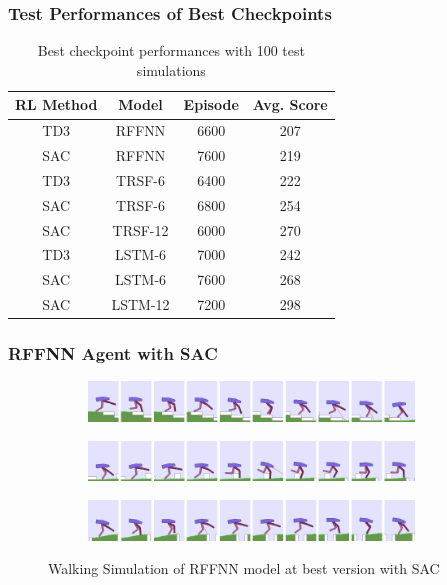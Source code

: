 \documentclass{beamer}
\begin{document}
\begin{frame}
\frametitle{Test Performances of Best Checkpoints}
\begin{table}
	\begin{center}
		\caption{Best checkpoint performances with 100 test simulations}
		\begin{tabular}{||c c c c||} 
			\hline
			RL Method & Model & Episode & Avg. Score \\ [0.5ex] 
			\hline\hline
			TD3 & RFFNN & 6600 & 207 \\ 
			\hline
			SAC & RFFNN & 7600 & 219 \\
			\hline
			TD3 & TRSF-6 & 6400 & 222 \\
			\hline
			SAC & TRSF-6 & 6800 & 254 \\
			\hline
			SAC & TRSF-12 & 6000 & 270 \\
			\hline
			TD3 & LSTM-6 & 7000 & 242 \\
			\hline
			SAC & LSTM-6 & 7600 & 268 \\
			\hline
			SAC & LSTM-12 & 7200 & 298 \\ [1ex] 
			\hline
		\end{tabular}
		\label{table:ckpt_performance}
	\end{center}
\end{table}
\end{frame}

\begin{frame}
\frametitle{RFFNN Agent with SAC}
\begin{figure}[!ht]
	\centering
	\begin{subfigure}{.95\textwidth}
		\centering
		\includegraphics[width=0.95\textwidth]{figures/bipedal/anim/ff-stairs.png}
		\label{fig:anim_rffnn_stairs}
	\end{subfigure}
	\begin{subfigure}{.95\textwidth}
		\centering
		\includegraphics[width=0.95\textwidth]{figures/bipedal/anim/ff-hurdle.png}
		\label{fig:anim_rffnn_hurdle}
	\end{subfigure}
	\begin{subfigure}{.95\textwidth}
		\centering
		\includegraphics[width=0.95\textwidth]{figures/bipedal/anim/ff-pitfall.png}
		\label{fig:anim_rffnn_pitfall}
	\end{subfigure}
	\caption{Walking Simulation of RFFNN model at best version with SAC}
	\label{fig:rffnn_simulation}
\end{figure}
\end{frame}
\end{document}
